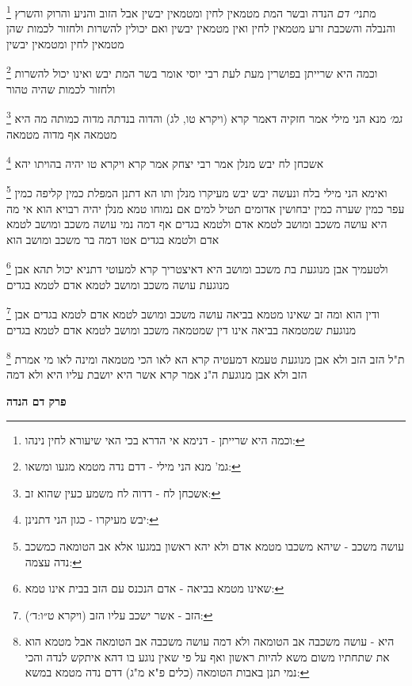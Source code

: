 \documentclass[12pt, openany]{book}
\newcommand{\sethebfont}{
\fontsize{10.5pt}{21.0pt} \selectfont
}
\newcommand{\twocol}[1]{
	{\sethebfont \begin{multicols}{2}
			#1
	\end{multicols}}	
}
\newcommand{\chapname}{}
\newcommand{\newchap}[1]{
	\addcontentsline{toc}{chapter}{#1}
	\renewcommand{\chapname}{#1}
		\begin{center}
			\textbf{%
\fontsize{16pt}{16pt}\selectfont
				#1}
		\end{center}
}
\newcommand{\footnotecomment}[1]{
	\renewcommand\thefootnote{}
	\footnote{#1}}
\newcommand{\commenta}[1]{\footnotecomment{#1}}
\begin{document}
{\commenta{וכמה היא שרייתן - דנימא אי הדרא בכי האי שיעורא לחין נינהו:}
מתני׳ {\large\emph{דם}} הנדה ובשר המת מטמאין לחין ומטמאין יבשין אבל הזוב והניע והרוק והשרץ והנבלה והשכבת זרע מטמאין לחין ואין מטמאין יבשין ואם יכולין להשרות ולחזור לכמות שהן מטמאין לחין ומטמאין יבשין 
\commenta{גמ' מנא הני מילי - דדם נדה מטמא מגעו ומשאו:}
וכמה היא שרייתן בפושרין מעת לעת רבי יוסי אומר בשר המת יבש ואינו יכול להשרות ולחזור לכמות שהיה טהור
\commenta{אשכחן לח - דדוה לח משמע כעין שהוא זב:}
{\large\emph{גמ׳}} מנא הני מילי אמר חזקיה דאמר קרא (ויקרא טו, לג) והדוה בנדתה מדוה כמותה מה היא מטמאה אף מדוה מטמאה 
\commenta{יבש מעיקרו - כגון הני דתנינן:}
אשכחן לח יבש מנלן אמר רבי יצחק אמר קרא {ויקרא טו } יהיה בהויתו יהא 
\commenta{עושה משכב - שיהא משכבו מטמא אדם ולא יהא ראשון במגעו אלא אב הטומאה כמשכב נדה עצמה:}
ואימא הני מילי בלח ונעשה יבש יבש מעיקרו מנלן ותו הא דתנן המפלת כמין קליפה כמין עפר כמין שערה כמין יבחושין אדומים תטיל למים אם נמוחו טמא מנלן יהיה רבויא הוא 
אי מה היא עושה משכב ומושב לטמא אדם ולטמא בגדים אף דמה נמי עושה משכב ומושב לטמא אדם ולטמא בגדים אטו דמה בר משכב ומושב הוא 
\commenta{שאינו מטמא בביאה - אדם הנכנס עם הזב בבית אינו טמא:}
ולטעמיך אבן מנוגעת בת משכב ומושב היא דאיצטריך קרא למעוטי דתניא יכול תהא אבן מנוגעת עושה משכב ומושב לטמא אדם לטמא בגדים 
\commenta{הזב - אשר ישכב עליו הזב (ויקרא ט״ו:ד׳):}
ודין הוא ומה זב שאינו מטמא בביאה עושה משכב ומושב לטמא אדם לטמא בגדים אבן מנוגעת שמטמאה בביאה אינו דין שמטמאה משכב ומושב לטמא אדם לטמא בגדים
\commenta{היא - עושה משכבה אב הטומאה ולא דמה עושה משכבה אב הטומאה אבל מטמא הוא את שתחתיו משום משא להיות ראשון ואף על פי שאין נוגע בו דהא איתקש לנדה והכי נמי תנן באבות הטומאה (כלים פ"א מ"ג) דדם נדה מטמא במשא:}
ת"ל הזב הזב ולא אבן מנוגעת טעמא דמעטיה קרא הא לאו הכי מטמאה 
ומינה לאו מי אמרת הזב ולא אבן מנוגעת ה"נ אמר קרא אשר היא יושבת עליו היא ולא דמה}

\newchap{פרק  דם הנדה}
\twocol{\clearpage}
\end{document}
